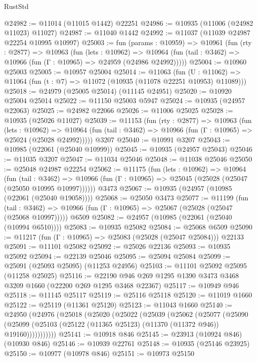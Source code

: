 \begin{lexlean}{RustStd}
\begin{coremodule}
{{{{{{{{{{{{{{{{{{{@24982 := @11014 (@11015 @1442) @22251
@24986 := @10935 (@11006 (@24982 @11023) @11027)
@24987 := @11040 @1442
@24992 := @11037 (@11039 @24987 @22254 @10995 @10997)
@25003 := fun (params : @10959) =>
  @10961
    (fun (rty : @2877) =>
    @10963
      (fun (lets : @10962) =>
      @10964 (fun (tail : @3462) => @10966 (fun (Γ : @10965) => @24959 (@24986 @24992)))))
@25004 := @10960 @25003
@25005 := @10957 @25004
@25014 := @11063
    (fun (U : @11062) => @11064 (fun (t : @7) => @11072 (@10935 (@11078 @22251 @10953) @11089)))
@25018 := @24979 (@25005 @25014) (@11145 @24951)
@25020 := @10920 @25004 @25014
@25022 := @11150 @25003 @5947
@25024 := @10935 (@24957 @22063)
@25025 := @24982 @22066
@25026 := @11006 @25025
@25028 := @10935 (@25026 @11027)
@25039 := @11153
    (fun (rty : @2877) =>
    @10963
      (fun (lets : @10962) =>
      @10964 (fun (tail : @3462) => @10966 (fun (Γ : @10965) => @25024 (@25028 @24992)))))
    @3207
@25040 := @10991 @3207
@25043 := @10985 (@22061 (@25040 @10999))
@25045 := @10935 (@24957 @25043)
@25046 := @11035 @3207
@25047 := @11034 @25046
@25048 := @11038 @25046
@25050 := @25048 @24987 @22254
@25062 := @11175
    (fun (lets : @10962) =>
    @10964
      (fun (tail : @3462) =>
      @10966 (fun (Γ : @10965) => @25045 (@25028 (@25047 (@25050 @10995 @10997))))))
    @3473
@25067 := @10935 (@24957 (@10985 (@22061 (@25040 @19058))))
@25068 := @25050 @3473
@25077 := @11199
    (fun (tail : @3462) => @10966 (fun (Γ : @10965) => @25067 (@25028 (@25047 (@25068 @10997)))))
    @6509
@25082 := @24957 (@10985 (@22061 (@25040 (@10994 @6510))))
@25083 := @10935 @25082
@25084 := @25068 @6509
@25090 := @11217 (fun (Γ : @10965) => @25083 (@25028 (@25047 @25084))) @22133
@25091 := @11101 @25082
@25092 := @25026 @22136
@25093 := @10935 @25092
@25094 := @22139 @25046
@25095 := @25094 @25084
@25099 := @25091 (@25093 @25095) (@11253 @24956)
@25103 := @11101 @25092 @25095 (@11258 @25025)
@25116 := @22190 @946 @269 @1295 @1390 @3473 @3468 @3209 @1660 (@22200 @269 @1295 @3468 @22367)
@25117 := @10949 @946
@25118 := @11145 @25117
@25119 := @25116 @25118
@25120 := @11019 @1660
@25122 := @25119 (@11361 @25120)
@25123 := @11043 @1660
@25140 := @24950
    (@24976
      (@25018
        (@25020
          (@25022
            (@25039
              (@25062
                (@25077
                  (@25090
                    (@25099 (@25103 (@25122 (@11365 @25123) (@11370 (@11372 @946)) @19160)))))))))))
@25141 := @10918 @846
@25145 := @23913 (@10924 @846) (@10930 @846)
@25146 := @10939 @22761
@25148 := @10935 (@25146 @23925)
@25150 := @10977 (@10978 @846)
@25151 := @10973 @25150
}}}}}}}}}}}}}}}}}}}
\end{coremodule}
\end{lexlean}
